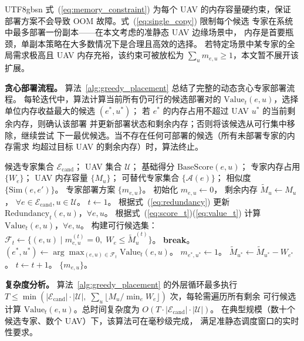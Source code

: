 \documentclass[conference]{IEEEtran}
\begin{document}
\begin{CJK*}{UTF8}{gbsn}
式~(\ref{eq:memory_constraint}) 为每个 UAV 的内存容量硬约束，保证
部署方案不会导致 OOM 故障。式~(\ref{eq:single_copy}) 限制每个候选
专家在系统中最多部署一份副本——在本文考虑的准静态 UAV 边缘场景中，
内存是首要瓶颈，单副本策略在大多数情况下是合理且高效的选择。
若特定场景中某专家的全局需求极高且 UAV 内存充裕，该约束可被放松为
$\sum_u m_{e,u} \ge 1$，本文暂不展开该扩展。

\textbf{贪心部署流程。}
算法~\ref{alg:greedy_placement} 总结了完整的动态贪心专家部署流程。
每轮迭代中，算法计算当前所有仍可行的候选部署对的
$\mathrm{Value}_t(e,u)$，选择单位内存收益最大的候选 $(e^*,u^*)$；
若 $e^*$ 的内存占用不超过 UAV $u^*$ 的当前剩余内存，则确认该部署
并更新部署状态和剩余内存；否则将该候选从可行集中移除，继续尝试
下一最优候选。当不存在任何可部署的候选（所有未部署专家的内存需求
均超过目标 UAV 的剩余内存）时，算法终止。

\begin{algorithm}[t]
  \caption{动态贪心专家部署算法}
  \label{alg:greedy_placement}
  \begin{algorithmic}[1]
    \REQUIRE 候选专家集合 $\mathcal{E}_{\mathrm{cand}}$；
             UAV 集合 $\mathcal{U}$；
             基础得分 $\mathrm{BaseScore}(e,u)$；
             专家内存占用 $\{W_e\}$；
             UAV 内存容量 $\{M_u\}$；
             可替代专家集合 $\{\mathcal{A}(e)\}$；
             相似度 $\{\mathrm{Sim}(e,e')\}$。
    \ENSURE 专家部署方案 $\{m_{e,u}\}$。
    \STATE 初始化 $m_{e,u} \leftarrow 0$，
           剩余内存 $\tilde{M}_u \leftarrow M_u$，
           $\forall e\in\mathcal{E}_{\mathrm{cand}}, u\in\mathcal{U}$。
    \STATE $t \leftarrow 1$。
    \LOOP
      \STATE 根据式~(\ref{eq:redundancy}) 更新
             $\mathrm{Redundancy}_t(e,u)$，$\forall e,u$。
      \STATE 根据式~(\ref{eq:score_t})(\ref{eq:value_t}) 计算
             $\mathrm{Value}_t(e,u)$，$\forall e,u$。
      \STATE 构建可行候选集：
             $\mathcal{F}_t \leftarrow \{(e,u) \mid m_{e,u}^{(t)}=0,\;
               W_e \le \tilde{M}_u^{(t)}\}$。
        \STATE \textbf{break}。
      \ENDIF
      \STATE $(e^*,u^*) \leftarrow \arg\max_{(e,u)\in\mathcal{F}_t}
             \mathrm{Value}_t(e,u)$。
      \STATE $m_{e^*,u^*} \leftarrow 1$。
      \STATE $\tilde{M}_{u^*} \leftarrow \tilde{M}_{u^*} - W_{e^*}$。
      \STATE $t \leftarrow t + 1$。
    \ENDLOOP
    \RETURN $\{m_{e,u}\}$。
  \end{algorithmic}
\end{algorithm}

\textbf{复杂度分析。}
算法~\ref{alg:greedy_placement} 的外层循环最多执行
$T \le \min(|\mathcal{E}_{\mathrm{cand}}|\cdot|\mathcal{U}|,\;
\sum_u \lfloor M_u / \min_e W_e\rfloor)$ 次，每轮需遍历所有剩余
可行候选计算 $\mathrm{Value}_t(e,u)$。总时间复杂度为
$O(T\cdot|\mathcal{E}_{\mathrm{cand}}|\cdot|\mathcal{U}|)$。
在典型规模（数十个候选专家、数个 UAV）下，该算法可在毫秒级完成，
满足准静态调度窗口的实时性要求。


\end{CJK*}
\end{document}
